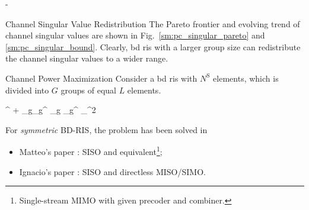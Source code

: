 \documentclass[journal]{IEEEtran}
\begin{document}
\begin{section}{-}
\begin{subsection}{Channel Singular Value Redistribution}
		The Pareto frontier and evolving trend of channel singular values are shown in Fig.~\ref{sm:pc_singular_pareto} and \ref{sm:pc_singular_bound}.
		Clearly, \gls{bd} \gls{ris} with a larger group size can redistribute the channel singular values to a wider range.
	\end{subsection}
	\begin{subsection}{Channel Power Maximization}
		Consider a \gls{bd} \gls{ris} with $N^\mathrm{S}$ elements, which is divided into $G$ groups of equal $L$ elements.
		\begin{maxi!}
			{\scriptstyle{\mathbf{\Theta}}}{\left\lVert {}^ + \sum_g\nolimits {}_g^ \mathbf{\Theta}_g _g^ \right\rVert _^2}{\label{op:pc_power}}{}
		\end{maxi!}
		For \emph{symmetric} BD-RIS, the problem has been solved in
		\begin{itemize}
			\item Matteo's paper \cite{Nerini2023}: SISO and equivalent\footnote{Single-stream MIMO with given precoder and combiner.};
			\item Ignacio's paper \cite{Santamaria2023}: SISO and directless MISO/SIMO.
		\end{itemize}


\end{subsection}
\end{section}
\end{document}
